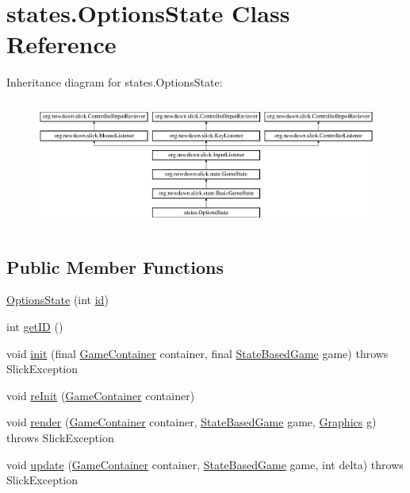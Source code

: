 \hypertarget{classstates_1_1_options_state}{}\section{states.\+Options\+State Class Reference}
\label{classstates_1_1_options_state}
Inheritance diagram for states.\+Options\+State\+:\begin{figure}[H]
\begin{center}
\leavevmode
\includegraphics[height=4.226415cm]{classstates_1_1_options_state}
\end{center}
\end{figure}
\subsection*{Public Member Functions}
\begin{DoxyCompactItemize}
\item 
\mbox{\hyperlink{classstates_1_1_options_state_a8ececa696cb63624887652040f6f81d6}{Options\+State}} (int \mbox{\hyperlink{classstates_1_1_options_state_a55f5f77b21511b9bb3a1c306bf81c091}{id}})
\item 
int \mbox{\hyperlink{classstates_1_1_options_state_a8db11ba0aff06b6e7afe929599640c73}{get\+ID}} ()
\item 
void \mbox{\hyperlink{classstates_1_1_options_state_a173809c3faa8e5ba70be2b5c3b374899}{init}} (final \mbox{\hyperlink{classorg_1_1newdawn_1_1slick_1_1_game_container}{Game\+Container}} container, final \mbox{\hyperlink{classorg_1_1newdawn_1_1slick_1_1state_1_1_state_based_game}{State\+Based\+Game}} game)  throws Slick\+Exception 
\item 
void \mbox{\hyperlink{classstates_1_1_options_state_acf38025ae1ce24fe71018bc2f0918fcf}{re\+Init}} (\mbox{\hyperlink{classorg_1_1newdawn_1_1slick_1_1_game_container}{Game\+Container}} container)
\item 
void \mbox{\hyperlink{classstates_1_1_options_state_a6ef7592783839cec26d0d167d84252cc}{render}} (\mbox{\hyperlink{classorg_1_1newdawn_1_1slick_1_1_game_container}{Game\+Container}} container, \mbox{\hyperlink{classorg_1_1newdawn_1_1slick_1_1state_1_1_state_based_game}{State\+Based\+Game}} game, \mbox{\hyperlink{classorg_1_1newdawn_1_1slick_1_1_graphics}{Graphics}} g)  throws Slick\+Exception 
\item 
void \mbox{\hyperlink{classstates_1_1_options_state_a9c157deaed29b7efad997acfa6999cd8}{update}} (\mbox{\hyperlink{classorg_1_1newdawn_1_1slick_1_1_game_container}{Game\+Container}} container, \mbox{\hyperlink{classorg_1_1newdawn_1_1slick_1_1state_1_1_state_based_game}{State\+Based\+Game}} game, int delta)  throws Slick\+Exception 
\end{DoxyCompactItemize}

